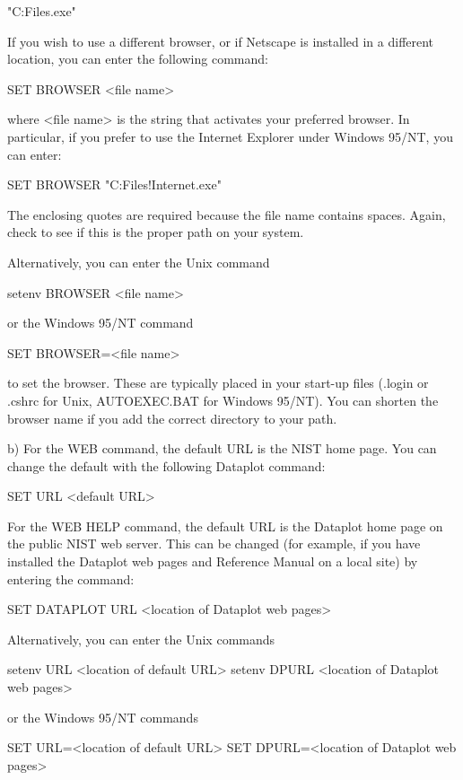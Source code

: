 {          "C:\Program Files\NETSCAPE\NAVIGATOR\PROGRAM\netscape.exe"

       If you wish to use a different browser, or if Netscape is
       installed in a different location, you can enter the
       following command:

          SET BROWSER <file name>

       where <file name> is the string that activates your preferred
       browser.  In particular, if you prefer to use the Internet
       Explorer under Windows 95/NT, you can enter:

           SET BROWSER "C:\Program Files\Plus!\Microsoft Internet\iexplore.exe"

       The enclosing quotes are required because the file name contains
       spaces.  Again, check to see if this is the proper path on
       your system.

       Alternatively, you can enter the Unix command

           setenv BROWSER <file name>

       or the Windows 95/NT command

          SET BROWSER=<file name>

       to set the browser.  These are typically placed in your
       start-up files (.login or .cshrc for Unix, AUTOEXEC.BAT for
       Windows 95/NT).  You can shorten the browser name if you add
       the correct directory to your path.

    b) For the WEB command, the default URL is the NIST home page.
       You can change the default with the following Dataplot command:

           SET URL <default URL>

       For the WEB HELP command, the default URL is the Dataplot
       home page on the public NIST web server.  This can be
       changed (for example, if you have installed the Dataplot
       web pages and Reference Manual on a local site) by entering
       the command:

          SET DATAPLOT URL <location of Dataplot web pages>

       Alternatively, you can enter the Unix commands

          setenv URL <location of default URL>
          setenv DPURL <location of Dataplot web pages>

       or the Windows 95/NT commands

          SET URL=<location of default URL>
          SET DPURL=<location of Dataplot web pages>

}
